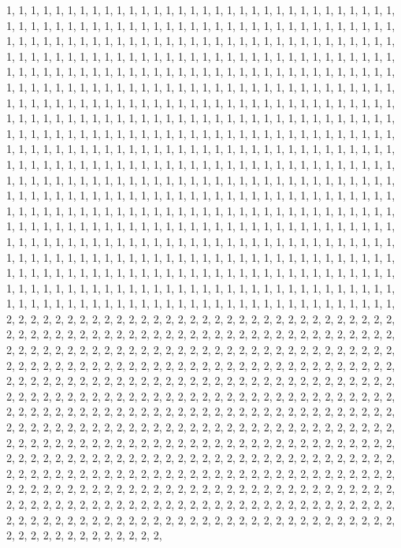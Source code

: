 \documentclass[
]{article}
\begin{document}
\begin{Schunk}
\begin{Soutput}
1, 1, 1, 1, 1, 1, 1, 1, 1, 1, 1, 1, 1, 1, 1, 1, 1, 1, 1, 1, 1, 1, 1, 1, 1, 1, 1, 1, 1, 1, 1, 1, 1, 1, 1, 1, 1, 1, 1, 1, 1, 1, 1, 1, 1, 1, 1, 1, 1, 1, 1, 1, 1, 1, 1, 1, 1, 1, 1, 1, 1, 1, 1, 1, 1, 1, 1, 1, 1, 1, 1, 1, 1, 1, 1, 1, 1, 1, 1, 1, 1, 1, 1, 1, 1, 1, 1, 1, 1, 1, 1, 1, 1, 1, 1, 1, 1, 1, 1, 1, 1, 1, 1, 1, 1, 1, 1, 1, 1, 1, 1, 1, 1, 1, 1, 1, 1, 1, 1, 1, 1, 1, 1, 1, 1, 1, 1, 1, 1, 1, 1, 1, 1, 1, 1, 1, 1, 1, 1, 1, 1, 1, 1, 1, 1, 1, 1, 1, 1, 1, 1, 1, 1, 1, 1, 1, 1, 1, 1, 1, 1, 1, 1, 1, 1, 1, 1, 1, 1, 1, 1, 1, 1, 1, 1, 1, 1, 1, 1, 1, 1, 1, 1, 1, 1, 1, 1, 1, 1, 1, 1, 1, 1, 1, 1, 1, 1, 1, 1, 1, 1, 1, 1, 1, 1, 1, 1, 1, 1, 1, 1, 1, 1, 1, 1, 1, 1, 1, 1, 1, 1, 1, 1, 1, 1, 1, 1, 1, 1, 1, 1, 1, 1, 1, 1, 1, 1, 1, 1, 1, 1, 1, 1, 1, 1, 1, 1, 1, 1, 1, 1, 1, 1, 1, 1, 1, 1, 1, 1, 1, 1, 1, 1, 1, 1, 1, 1, 1, 1, 1, 1, 1, 1, 1, 1, 1, 1, 1, 1, 1, 1, 1, 1, 1, 1, 1, 1, 1, 1, 1, 1, 1, 1, 1, 1, 1, 1, 1, 1, 1, 1, 1, 1, 1, 1, 1, 1, 1, 1, 1, 1, 1, 1, 1, 1, 1, 1, 1, 1, 1, 1, 1, 1, 1, 1, 1, 1, 1, 1, 1, 1, 1, 1, 1, 1, 1, 1, 1, 1, 1, 1, 1, 1, 1, 1, 1, 1, 1, 1, 1, 1, 1, 1, 1, 1, 1, 1, 1, 1, 1, 1, 1, 1, 1, 1, 1, 1, 1, 1, 1, 1, 1, 1, 1, 1, 1, 1, 1, 1, 1, 1, 1, 1, 1, 1, 1, 1, 1, 1, 1, 1, 1, 1, 1, 1, 1, 1, 1, 1, 1, 1, 1, 1, 1, 1, 1, 1, 1, 1, 1, 1, 1, 1, 1, 1, 1, 1, 1, 1, 1, 1, 1, 1, 1, 1, 1, 1, 1, 1, 1, 1, 1, 1, 1, 1, 1, 1, 1, 1, 1, 1, 1, 1, 1, 1, 1, 1, 1, 1, 1, 1, 1, 1, 1, 1, 1, 1, 1, 1, 1, 1, 1, 1, 1, 1, 1, 1, 1, 1, 1, 1, 1, 1, 1, 1, 1, 1, 1, 1, 1, 1, 1, 1, 1, 1, 1, 1, 1, 1, 1, 1, 1, 1, 1, 1, 1, 1, 1, 1, 1, 1, 1, 1, 1, 1, 1, 1, 1, 1, 1, 1, 1, 1, 1, 1, 1, 1, 1, 1, 1, 1, 1, 1, 1, 1, 1, 1, 1, 1, 1, 1, 1, 1, 1, 1, 1, 1, 1, 1, 1, 1, 1, 1, 1, 1, 1, 1, 1, 1, 1, 1, 1, 1, 1, 1, 1, 1, 1, 1, 1, 1, 1, 1, 1, 1, 1, 1, 1, 1, 1, 1, 1, 1, 1, 1, 1, 1, 1, 1, 1, 1, 1, 1, 1, 1, 1, 1, 1, 1, 1, 1, 1, 1, 1, 1, 1, 1, 1, 1, 1, 1, 1, 1, 1, 1, 1, 1, 1, 1, 1, 1, 1, 1, 1, 1, 1, 1, 1, 1, 1, 1, 1, 1, 1, 1, 1, 1, 1, 1, 1, 1, 1, 1, 1, 1, 1, 1, 1, 1, 1, 2, 2, 2, 2, 2, 2, 2, 2, 2, 2, 2, 2, 2, 2, 2, 2, 2, 2, 2, 2, 2, 2, 2, 2, 2, 2, 2, 2, 2, 2, 2, 2, 2, 2, 2, 2, 2, 2, 2, 2, 2, 2, 2, 2, 2, 2, 2, 2, 2, 2, 2, 2, 2, 2, 2, 2, 2, 2, 2, 2, 2, 2, 2, 2, 2, 2, 2, 2, 2, 2, 2, 2, 2, 2, 2, 2, 2, 2, 2, 2, 2, 2, 2, 2, 2, 2, 2, 2, 2, 2, 2, 2, 2, 2, 2, 2, 2, 2, 2, 2, 2, 2, 2, 2, 2, 2, 2, 2, 2, 2, 2, 2, 2, 2, 2, 2, 2, 2, 2, 2, 2, 2, 2, 2, 2, 2, 2, 2, 2, 2, 2, 2, 2, 2, 2, 2, 2, 2, 2, 2, 2, 2, 2, 2, 2, 2, 2, 2, 2, 2, 2, 2, 2, 2, 2, 2, 2, 2, 2, 2, 2, 2, 2, 2, 2, 2, 2, 2, 2, 2, 2, 2, 2, 2, 2, 2, 2, 2, 2, 2, 2, 2, 2, 2, 2, 2, 2, 2, 2, 2, 2, 2, 2, 2, 2, 2, 2, 2, 2, 2, 2, 2, 2, 2, 2, 2, 2, 2, 2, 2, 2, 2, 2, 2, 2, 2, 2, 2, 2, 2, 2, 2, 2, 2, 2, 2, 2, 2, 2, 2, 2, 2, 2, 2, 2, 2, 2, 2, 2, 2, 2, 2, 2, 2, 2, 2, 2, 2, 2, 2, 2, 2, 2, 2, 2, 2, 2, 2, 2, 2, 2, 2, 2, 2, 2, 2, 2, 2, 2, 2, 2, 2, 2, 2, 2, 2, 2, 2, 2, 2, 2, 2, 2, 2, 2, 2, 2, 2, 2, 2, 2, 2, 2, 2, 2, 2, 2, 2, 2, 2, 2, 2, 2, 2, 2, 2, 2, 2, 2, 2, 2, 2, 2, 2, 2, 2, 2, 2, 2, 2, 2, 2, 2, 2, 2, 2, 2, 2, 2, 2, 2, 2, 2, 2, 2, 2, 2, 2, 2, 2, 2, 2, 2, 2, 2, 2, 2, 2, 2, 2, 2, 2, 2, 2, 2, 2, 2, 2, 2, 2, 2, 2, 2, 2, 2, 2, 2, 2, 2, 2, 2, 2, 2, 2, 2, 2, 2, 2, 2, 2, 2, 2, 2, 2, 2, 2, 2, 2, 2, 2, 2, 2, 2, 2, 2, 2, 2, 2, 2, 2, 2, 2, 2, 2, 2, 2, 2, 2, 2, 2, 2, 2, 2, 2, 2, 2, 2, 2, 2, 2, 2, 2, 2, 2, 2, 2, 2, 2, 2, 2, 2, 2, 2, 2, 2, 2, 2, 2, 2, 2, 2, 2, 2, 2, 2, 2, 2, 2, 2, 2, 2, 2, 2, 2, 2, 2, 2, 2, 2, 2, 2, 
\end{Soutput}
\end{Schunk}
\end{document}
